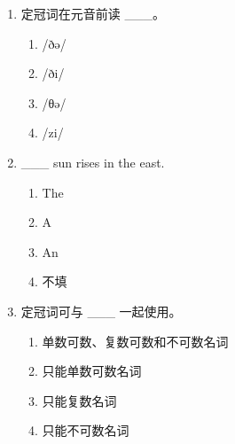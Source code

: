 \documentclass[11pt,a4paper]{ctexart}
\begin{document}
\begin{enumerate}[leftmargin=*,itemsep=4pt]
\item 定冠词在元音前读 \_\_\_。
\begin{enumerate}[label=\Alph*.,leftmargin=2em,itemsep=1pt,topsep=2pt]
\item /ðə/
\item /ði/
\item /θə/
\item /zi/
\end{enumerate}
\item \_\_\_ sun rises in the east.
\begin{enumerate}[label=\Alph*.,leftmargin=2em,itemsep=1pt,topsep=2pt]
\item The
\item A
\item An
\item 不填
\end{enumerate}
\item 定冠词可与 \_\_\_ 一起使用。
\begin{enumerate}[label=\Alph*.,leftmargin=2em,itemsep=1pt,topsep=2pt]
\item 单数可数、复数可数和不可数名词
\item 只能单数可数名词
\item 只能复数名词
\item 只能不可数名词
\end{enumerate}
\end{enumerate}
\end{document}
